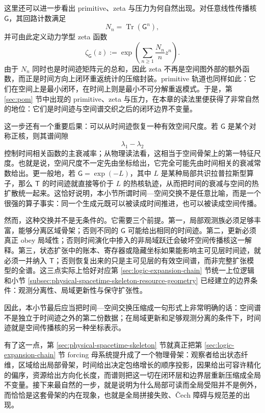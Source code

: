 这里还可以进一步看出 primitive、zeta 与压力为何自然出现。对任意线性传播核 \(\mathsf G\)，其回路计数满足
\[
N_n=\operatorname{Tr}(\mathsf G^n),
\]
并可由此定义动力学型 zeta 函数
\[
\zeta_{\mathsf G}(z)
:=
\exp\!\left(
\sum_{n\ge 1}\frac{N_n}{n}z^n
\right).
\]
由于 \(N_n\) 同时也是时间迹矩阵元的总和，因此 zeta 不再是空间图外部的额外函数，而正是时间方向上闭环重返统计的压缩封装。primitive 轨道也同样如此：它们在空间上是最小闭环，在时间上则是最小不可分解重返模式。于是，第 \ref{sec:pom} 节中出现的 primitive、zeta 与压力，在本章的读法里便获得了非常自然的地位：它们是时间迹与空间谱交织之后的闭环边界不变量。

这一步还有一个重要后果：可以从时间迹恢复一种有效空间尺度。若 \(\mathsf G\) 是某个对称正核，则其谱间隙
\[
\lambda_1-\lambda_2
\]
控制时间相关函数的主衰减率；从物理读法看，这相当于空间骨架上的第一特征尺度。也就是说，空间尺度不一定先由坐标给出，它完全可能先由时间相关的衰减常数给出。更一般地，若 \(\mathsf G=\exp(-L)\)，其中 \(L\) 是某种局部共识拉普拉斯型算子，那么 \(\mathsf T\) 的时间迹就直接等价于 \(L\) 的热核轨迹，从而把时间的衰减与空间的热扩散统一起来。这恰好说明，本小节所谓时间—空间交换不是任意比喻，而是一个很强的算子事实：同一个生成元既可以被读成时间推进，也可以被读成空间传播。

然而，这种交换并不是无条件的。它需要三个前提。第一，局部观测族必须足够丰富，能够分离区域骨架；否则不同的 \(\mathsf G\) 可能给出相同的时间迹。第二，更新必须真正 obey 局域性；否则时间演化中掺入的非局域跃迁会破坏空间传播核这一解释。第三，状态扩张中的账本、寄存器或隐藏坐标如果能影响主可见层时间迹，就必须一并纳入 \(\mathsf T\)；否则恢复出来的只是主可见层的有效空间谱，而非完整扩张模型的全谱。这三点实际上恰好对应第 \ref{sec:logic-expansion-chain} 节统一上位逻辑和小节 \ref{subsec:physical-spacetime-skeleton-resource-geometry} 已经建立的边界条件：观测分离性、局域更新性与保守扩张性。

因此，本小节最后应当把时间—空间交换压缩成一句形式上非常明确的话：空间谱不是独立于时间迹之外的第二份数据；在局域更新和足够观测分离的条件下，时间迹就是空间传播核的另一种坐标表示。

有了这一点，第 \ref{sec:physical-spacetime-skeleton} 节就真正把第 \ref{sec:logic-expansion-chain} 节 forcing 母系统提升成了一个物理骨架：观察者给出状态纤维，区域给出局部骨架，时间给出决定包络增长的顺序投影，因果给出可容许精化的偏序，资源给出方向化长度，而谱则把这一切在闭环层和边界层重新压缩成全局不变量。接下来最自然的一步，就是说明为什么局部可读而全局受阻并不是例外，而恰恰是这套骨架的内在现象，也就是全局拼接失败、Čech 障碍与规范差的出现。
